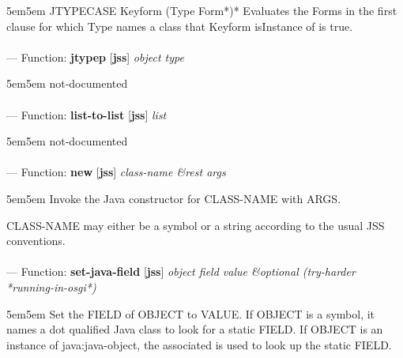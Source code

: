 \begin{adjustwidth}{5em}{5em}
JTYPECASE Keyform {(Type Form*)}*
  Evaluates the Forms in the first clause for which Type names a class that Keyform isInstance of
  is true.
\end{adjustwidth}

\paragraph{}
\label{JSS:JTYPEP}
--- Function: \textbf{jtypep} [\textbf{jss}] \textit{object type}

\begin{adjustwidth}{5em}{5em}
not-documented
\end{adjustwidth}

\paragraph{}
\label{JSS:LIST-TO-LIST}
--- Function: \textbf{list-to-list} [\textbf{jss}] \textit{list}

\begin{adjustwidth}{5em}{5em}
not-documented
\end{adjustwidth}

\paragraph{}
\label{JSS:NEW}
--- Function: \textbf{new} [\textbf{jss}] \textit{class-name \&rest args}

\begin{adjustwidth}{5em}{5em}
Invoke the Java constructor for CLASS-NAME with ARGS.

CLASS-NAME may either be a symbol or a string according to the usual JSS conventions.
\end{adjustwidth}

\paragraph{}
\label{JSS:SET-JAVA-FIELD}
--- Function: \textbf{set-java-field} [\textbf{jss}] \textit{object field value \&optional (try-harder *running-in-osgi*)}

\begin{adjustwidth}{5em}{5em}
Set the FIELD of OBJECT to VALUE.
If OBJECT is a symbol, it names a dot qualified Java class to look for
a static FIELD.  If OBJECT is an instance of java:java-object, the
associated is used to look up the static FIELD.
\end{adjustwidth}

